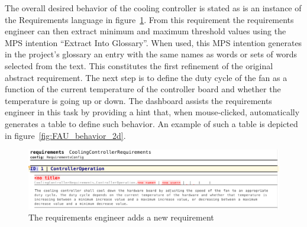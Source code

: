 The overall desired behavior of the cooling controller is stated as is an instance of the
\textsf{Requirements} language in figure~\ref{fig:new_req}. From this
requirement the requirements engineer can then extract minimum and maximum
threshold values using the MPS intention ``Extract Into Glossary''. When used, this MPS intention generates in the
project's glossary an entry with the same names as words or sets of words
selected from the text. This constitutes the first refinement of the original
abstract requirement. The next step is to define the duty cycle of the fan as a
function of the current temperature of the controller board and whether the temperature is going
up or down. The dashboard assists the requirements engineer in this task by
providing a hint that, when mouse-clicked, automatically generates a table to
define such behavior. An example of such a table is depicted in
figure~\ref{fig:FAU_behavior_2d}.
 \vspace{-.5cm}
\begin{figure}[!h]
\centering 
\includegraphics[width=1\textwidth]{./figures/textReqIncomplete.png}
\vspace{-.7cm}
\caption{The requirements engineer adds a new requirement}
\label{fig:new_req}
\vspace{-.7cm}
\end{figure}

